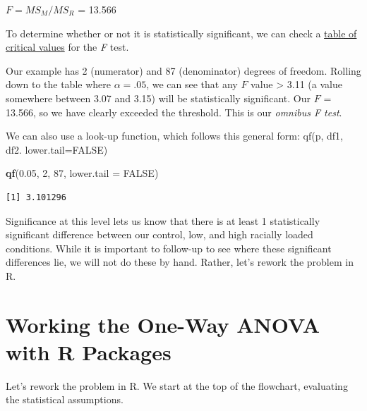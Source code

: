 \documentclass[
  11pt,
]{book}
\newenvironment{Shaded}{\begin{snugshade}}{\end{snugshade}}
\newcommand{\AttributeTok}[1]{\textcolor[rgb]{0.27,0.27,0.27}{#1}}
\newcommand{\ConstantTok}[1]{\textcolor[rgb]{0.37,0.37,0.37}{#1}}
\newcommand{\DecValTok}[1]{\textcolor[rgb]{0.06,0.06,0.06}{#1}}
\newcommand{\FloatTok}[1]{\textcolor[rgb]{0.06,0.06,0.06}{#1}}
\newcommand{\FunctionTok}[1]{\textcolor[rgb]{0.27,0.27,0.27}{\textbf{#1}}}
\newcommand{\NormalTok}[1]{#1}
\begin{document}
\(F = MS_{M}/MS_{R}\) = 13.566

To determine whether or not it is statistically significant, we can check a \href{https://www.statology.org/how-to-read-the-f-distribution-table/}{table of critical values} \citep{zach_how_2019} for the \emph{F} test.

Our example has 2 (numerator) and 87 (denominator) degrees of freedom. Rolling down to the table where \(\alpha = .05\), we can see that any \(F\) value \textgreater{} 3.11 (a value somewhere between 3.07 and 3.15) will be statistically significant. Our \(F\) = 13.566, so we have clearly exceeded the threshold. This is our \emph{omnibus F test}.

We can also use a look-up function, which follows this general form: qf(p, df1, df2. lower.tail=FALSE)

\begin{Shaded}
\begin{Highlighting}[]
\FunctionTok{qf}\NormalTok{(}\FloatTok{0.05}\NormalTok{, }\DecValTok{2}\NormalTok{, }\DecValTok{87}\NormalTok{, }\AttributeTok{lower.tail =} \ConstantTok{FALSE}\NormalTok{)}
\end{Highlighting}
\end{Shaded}

\begin{verbatim}
[1] 3.101296
\end{verbatim}

Significance at this level lets us know that there is at least 1 statistically significant difference between our control, low, and high racially loaded conditions. While it is important to follow-up to see where these significant differences lie, we will not do these by hand. Rather, let's rework the problem in R.

\hypertarget{working-the-one-way-anova-with-r-packages}{%
\section{Working the One-Way ANOVA with R Packages}\label{working-the-one-way-anova-with-r-packages}}

Let's rework the problem in R. We start at the top of the flowchart, evaluating the statistical assumptions.
\end{document}

